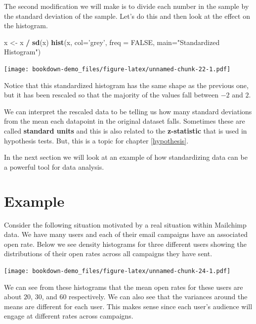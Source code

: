\documentclass[]{book}
\newenvironment{Shaded}{\begin{snugshade}}{\end{snugshade}}
\newcommand{\DataTypeTok}[1]{\textcolor[rgb]{0.13,0.29,0.53}{#1}}
\newcommand{\KeywordTok}[1]{\textcolor[rgb]{0.13,0.29,0.53}{\textbf{#1}}}
\newcommand{\NormalTok}[1]{#1}
\newcommand{\OperatorTok}[1]{\textcolor[rgb]{0.81,0.36,0.00}{\textbf{#1}}}
\newcommand{\OtherTok}[1]{\textcolor[rgb]{0.56,0.35,0.01}{#1}}
\newcommand{\StringTok}[1]{\textcolor[rgb]{0.31,0.60,0.02}{#1}}
\begin{document}
The second modification we will make is to divide each number in the sample by the standard deviation of the sample. Let's do this and then look at the effect on the histogram.

\begin{Shaded}
\begin{Highlighting}[]
\NormalTok{x <-}\StringTok{ }\NormalTok{x }\OperatorTok{/}\StringTok{ }\KeywordTok{sd}\NormalTok{(x)}
\KeywordTok{hist}\NormalTok{(x, }\DataTypeTok{col=}\StringTok{'grey'}\NormalTok{, }\DataTypeTok{freq =} \OtherTok{FALSE}\NormalTok{, }\DataTypeTok{main=}\StringTok{"Standardized Histogram"}\NormalTok{)}
\end{Highlighting}
\end{Shaded}

\texttt{[image: bookdown-demo\_files/figure-latex/unnamed-chunk-22-1.pdf]}

Notice that this standardized histogram has the same shape as the previous one, but it has been rescaled so that the majority of the values fall between \(-2\) and \(2\).

We can interpret the rescaled data to be telling us how many standard deviations from the mean each datapoint in the original dataset falls. Sometimes these are called \textbf{standard units} and this is also related to the \textbf{z-statistic} that is used in hypothesis tests. But, this is a topic for chapter \ref{hypothesis}.

In the next section we will look at an example of how standardizing data can be a powerful tool for data analysis.

\hypertarget{example}{%
\section{Example}\label{example}}

Consider the following situation motivated by a real situation within Mailchimp data. We have many users and each of their email campaigns have an associated open rate. Below we see density histograms for three different users showing the distributions of their open rates across all campaigns they have sent.

\texttt{[image: bookdown-demo\_files/figure-latex/unnamed-chunk-24-1.pdf]}

We can see from these histograms that the mean open rates for these users are about \(20\), \(30\), and \(60\) respectively. We can also see that the variances around the means are different for each user. This makes sense since each user's audience will engage at different rates across campaigns.
\end{document}
